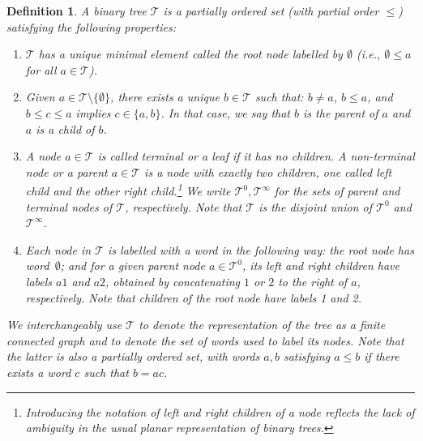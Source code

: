 \documentclass[a4paper,
11pt,  reqno]{amsart}
\newcommand{\5}{\textup{V}}
\newcommand{\noi}{\noindent}
\newtheorem{definition}[theorem]{Definition}
\theoremstyle{remark}
\newcommand{\TT}{\mathcal{T}}
\numberwithin{equation}{section}
\numberwithin{theorem}{section}
\begin{document}
\begin{definition}
\label{DEF:tree}
\rm 
A \emph{binary tree} $\TT$ is a partially ordered set (with partial order $\le$) satisfying the following properties:

\begin{enumerate}
\item[(i)] $\TT$ has a unique minimal element called the \textit{root node} labelled by $\emptyset$ (i.e., $\emptyset \le a$ for all $a \in \TT$). 

\smallskip 
\item[(ii)] Given $a\in \TT\setminus \{ \emptyset \}$, 
there exists a unique $b \in \TT$ such that: $b\ne a$, $b \le a$, and $b \le c \le a$ implies $c\in\{a,b\}$. In that case, we say that $b$ is the \textit{parent} of $a$ and $a$ is a \textit{child} of $b$. 

\smallskip 
\item[(iii)] A node $a\in \TT$ is called \textit{terminal} or a \textit{leaf} if it has no children. A \textit{non-terminal node} or a \textit{parent} $a\in\TT$ is a node with exactly two children, one called \textit{left child} and the other \textit{right child}.\footnote{Introducing the notation of left and right children of a node  reflects the lack of ambiguity in the usual planar representation of binary trees.}  
We write $\TT^0, \TT^\infty$ for the sets of parent and terminal nodes of $\TT$, respectively.  Note that $\TT$ is the disjoint union of $\TT^0$ and $\TT^\infty$. 

\smallskip 
\item[(iv)]
Each node in $\TT$ is labelled with a word in the following way: the root node has word~$\emptyset$; and for a given parent node $a\in \TT^0$, its left and right children have labels $a1$ and $a2$,  obtained by concatenating $1$ or $2$ to the right of $a$, respectively. Note that children of the root node have labels 1 and 2. 


\end{enumerate}



\noi
We interchangeably use $\TT$ to denote the representation of the tree as a finite connected graph and to denote the set of words used to label its nodes. Note that the latter is also a partially ordered set, with words $a,b$ satisfying $a\le b$ if there exists a word $c$ such that $b = ac$. 



\end{definition}
\end{document}
